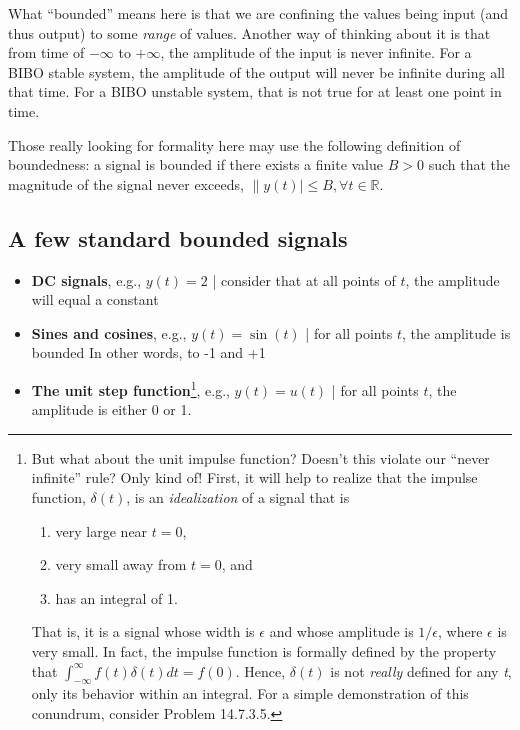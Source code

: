 \documentclass[11pt]{book}
\begin{document}
What ``bounded'' means here is that we are confining the values being input (and thus output) to some \textit{range} of values. Another way of thinking about it is that from time of $-\infty$ to $+\infty$, the amplitude of the input is never infinite. For a BIBO stable system, the amplitude of the output will never be infinite during all that time. For a BIBO unstable system, that is not true for at least one point in time.

Those really looking for formality here may use the following definition of boundedness: a signal is bounded if there exists a finite value $B > 0$ such that the magnitude of the signal never exceeds, $\|y(t)|\leq B, \forall t\in \mathbb {R} $.

\subsection{A few standard bounded signals}
\begin{itemize}
	\item \textbf{DC signals}, e.g., $y(t) = 2$ | consider that at all points of $t$, the amplitude will equal a constant
	\item \textbf{Sines and cosines}, e.g., $y(t) = \sin(t)$ | for all points $t$, the amplitude is bounded In other words, to -1 and +1
	\item \textbf{The unit step function}\footnote{But what about the unit impulse function? Doesn't this violate our ``never infinite'' rule? Only kind of! First, it will help to realize that the impulse function, $\delta(t)$, is an \textit{idealization} of a signal that is \begin{enumerate}
		\item very large near $t = 0$,
		\item very small away from $t = 0$, and
		\item has an integral of 1.
	\end{enumerate} That is, it is a signal whose width is $\epsilon$ and whose amplitude is $1/\epsilon$, where $\epsilon$ is very small. In fact, the impulse function is formally defined by the property that $\int_{-\infty}^{\infty}f(t)\delta(t)dt = f(0)$. Hence, $\delta(t)$ is not \textit{really} defined for any \textit{t}, only its behavior within an integral. For a simple demonstration of this conundrum, consider Problem 14.7.3.5.}, e.g., $y(t) = u(t)$ | for all points $t$, the amplitude is either 0 or 1.
\end{itemize}

\newpage
\end{document}
